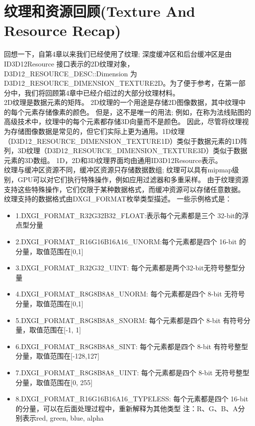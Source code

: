 \section{纹理和资源回顾(Texture And Resource Recap)}
\begin{flushleft}
回想一下，自第4章以来我们已经使用了纹理; 深度缓冲区和后台缓冲区是由 ID3D12Resource 接口表示的2D纹理对象，D3D12\_RESOURCE\_DESC::Dimension 为 D3D12\_RESOURCE\_DIMENSION\_TEXTURE2D。为了便于参考，在第一部分中，我们将回顾第4章中已经介绍过的大部分纹理材料。\\

2D纹理是数据元素的矩阵。 2D纹理的一个用途是存储2D图像数据，其中纹理中的每个元素存储像素的颜色。 但是，这不是唯一的用法; 例如，在称为法线贴图的高级技术中，纹理中的每个元素都存储3D向量而不是颜色。 因此，尽管将纹理视为存储图像数据是常见的，但它们实际上更为通用。1D纹理（D3D12\_RESOURCE\_DIMENSION\_TEXTURE1D）类似于数据元素的1D阵列，3D纹理（D3D12\_RESOURCE\_DIMENSION\_TEXTURE3D）类似于数据元素的3D数组。 1D，2D和3D纹理界面均由通用ID3D12Resource表示。\\

纹理与缓冲区资源不同，缓冲区资源只存储数据数组; 纹理可以具有mipmap级别，GPU可以对它们执行特殊操作，例如应用过滤器和多重采样。 由于纹理资源支持这些特殊操作，它们仅限于某种数据格式，而缓冲资源可以存储任意数据。 纹理支持的数据格式由DXGI\_FORMAT枚举类型描述。 一些示例格式是：\\
\end{flushleft}

\begin{itemize}
  \item 1.DXGI\_FORMAT\_R32G32B32\_FLOAT:表示每个元素都是三个 32-bit的浮点型分量
  \item 2.DXGI\_FORMAT\_R16G16B16A16\_UNORM:每个元素都是四个 16-bit 的分量，取值范围在[0,1]
  \item 3.DXGI\_FORMAT\_R32G32\_UINT: 每个元素都是两个32-bit无符号整型分量
  \item 4.DXGI\_FORMAT\_R8G8B8A8\_UNORM: 每个元素都是四个 8-bit 无符号分量，取值范围在[0,1]
  \item 5.DXGI\_FORMAT\_R8G8B8A8\_SNORM: 每个元素都是四个 8-bit 有符号分量，取值范围在[-1, 1]
  \item 6.DXGI\_FORMAT\_R8G8B8A8\_SINT: 每个元素都是四个 8-bit 有符号整型分量，取值范围在[-128,127]
  \item 7.DXGI\_FORMAT\_R8G8B8A8\_UINT: 每个元素都是四个 8-bit 无符号整型分量，取值范围在[0, 255]
  \item 8.DXGI\_FORMAT\_R16G16B16A16\_TYPELESS: 每个元素都是四个 16-bit 的分量，可以在后面处理过程中，重新解释为其他类型 注：R、G、B、A分别表示red, green, blue, alpha
\end{itemize}

